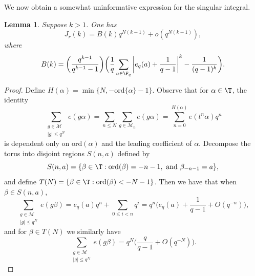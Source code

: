 \documentclass[reqno,11pt]{amsart}
\newtheorem{lemma}[theorem]{Lemma}
\theoremstyle{definition}
\theoremstyle{remark}
\numberwithin{equation}{section}
\def\calM{{\mathcal M}}
\newcommand{\ord}{\text{ord}}
\newcommand{\<}{\begin{equation}}
\renewcommand{\>}{\end{equation}}
\begin{document}
We now obtain a somewhat uninformative expression for the singular integral.
\begin{lemma}\label{sing-int}
    Suppose $k>1$. One has
    \[J_r(k) = B(k)q^{N(k-1)}+ o(q^{N(k-1)}),\]
    where
    \[B(k) = \bigg(\dfrac{q^{k-1}}{q^{k-1}-1}\bigg)\bigg(\dfrac{1}{q}\sum_{a \in \F_q} \bigg|e_q(a) + \dfrac{1}{q-1}\bigg|^k-\dfrac{1}{(q-1)^k}\bigg).\]
\end{lemma}
\begin{proof}
    Define $H(\alpha) = \min\{N,-\ord\{\alpha\} - 1\}$. Observe that for $\alpha \in \T$, the identity
    \[\sum_{\substack{g \in \calM \\ |g| \leq q^N}} e(g\alpha) = \sum_{n \leq N} \sum_{g \in \calM_n} e(g\alpha) = \sum_{n = 0}^{H(\alpha)} e(t^n\alpha)q^n\]
    is dependent only on $\ord(\alpha)$ and the leading coefficient of $\alpha$. Decompose the torus into disjoint regions $S(n,a)$ defined by
    \[S(n,a) = \{\beta \in \T: \ord(\beta) = -n-1, \text{ and } \beta_{-n-1} = a\},\]
    and define $T(N) = \{\beta \in \T:\ord(\beta)<-N-1\}$. Then we have that when $\beta \in S(n,a)$,
    \[\sum_{\substack{g \in \calM \\ |g| \leq q^N}} e(g\beta) = e_q(a)q^n + \sum_{0 \leq i < n} q^i = q^n\bigg(e_q(a) + \dfrac{1}{q-1} + O(q^{-n})\bigg),\]
    and for $\beta \in T(N)$ we similarly have
    \[\sum_{\substack{g \in \calM \\ |g| \leq q^N}} e(g\beta) = q^N\bigg(\dfrac{q}{q-1}+O(q^{-N})\bigg).\]


\end{proof}
\end{document}
